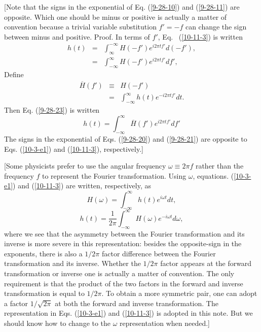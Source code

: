 \documentclass{article}
\begin{document}
[Note that the signs in the exponential of Eq. (\ref{9-28-10}) and
(\ref{9-28-11}) are opposite. Which one should be minus or positive is
actually a matter of convention because a trivial variable substitution $f' =
- f$ can change the sign between minus and positive. Proof. In terms of $f'$,
Eq. \ (\ref{10-11-3}) is written
\begin{eqnarray}
  h (t) & = & \int_{\infty}^{- \infty} H (- f') e^{i 2 \pi t f'} d (- f'),
  \nonumber\\
  & = & \int_{- \infty}^{\infty} H (- f') e^{i 2 \pi t f'} d f', 
  \label{9-28-23}
\end{eqnarray}
Define
\begin{eqnarray}
  \overline{H} (f') & \equiv & H (- f') \nonumber\\
  & = & \int_{- \infty}^{\infty} h (t) e^{- i 2 \pi t f'} d t. 
  \label{9-28-20}
\end{eqnarray}
Then Eq. (\ref{9-28-23}) is written
\begin{equation}
  \label{9-28-21} h (t) = \int_{- \infty}^{\infty} \overline{H} (f') e^{i 2
  \pi t f'} d f'
\end{equation}
The signs in the exponential of Eqs. (\ref{9-28-20}) and (\ref{9-28-21}) are
opposite to Eqs. (\ref{10-3-e1}) and (\ref{10-11-3}), respectively.]

[Some physicists prefer to use the angular frequency $\omega \equiv 2 \pi f$
rather than the frequency $f$ to represent the Fourier transformation. Using
$\omega$, equations. (\ref{10-3-e1}) and (\ref{10-11-3}) are written,
respectively, as
\begin{equation}
  H (\omega) = \int_{- \infty}^{\infty} h (t) e^{i \omega t} d t,
\end{equation}
\begin{equation}
  h (t) = \frac{1}{2 \pi} \int_{- \infty}^{\infty} H (\omega) e^{- i \omega t}
  d \omega,
\end{equation}
where we see that the asymmetry between the Fourier transformation and its
inverse is more severe in this representation: besides the opposite-sign in
the exponents, there is also a $1 / 2 \pi$ factor difference between the
Fourier transformation and its inverse. Whether the $1 / 2 \pi$ factor appears
at the forward transformation or inverse one is actually a matter of
convention. The only requirement is that the product of the two factors in the
forward and inverse transformation is equal to $1 / 2 \pi$. To obtain a more
symmetric pair, one can adopt a factor $1 / \sqrt{2 \pi}$ at both the forward
and inverse transformation. The representation in Eqs. (\ref{10-3-e1}) and
(\ref{10-11-3}) is adopted in this note. But we should know how to change to
the $\omega$ representation when needed.]
\end{document}

